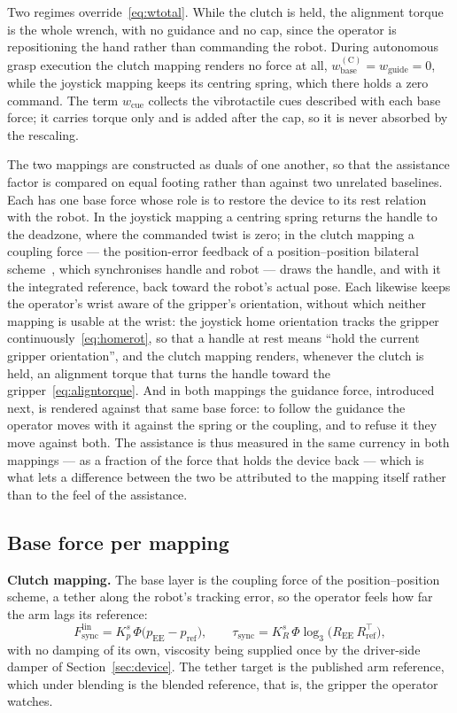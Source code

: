Two regimes override~\eqref{eq:wtotal}. While the clutch is held, the alignment torque is the whole wrench, with no guidance and no cap, since the operator is repositioning the hand rather than commanding the robot. During autonomous grasp execution the clutch mapping renders no force at all, $w_{\text{base}}^{(\text{C})} = w_{\text{guide}} = 0$, while the joystick mapping keeps its centring spring, which there holds a zero command. The term $w_{\text{cue}}$ collects the vibrotactile cues described with each base force; it carries torque only and is added after the cap, so it is never absorbed by the rescaling.

The two mappings are constructed as duals of one another, so that the assistance factor is compared on equal footing rather than against two unrelated baselines. Each has one base force whose role is to restore the device to its rest relation with the robot. In the joystick mapping a centring spring returns the handle to the deadzone, where the commanded twist is zero; in the clutch mapping a coupling force --- the position-error feedback of a position--position bilateral scheme~\cite{hokayem2006bilateral}, which synchronises handle and robot --- draws the handle, and with it the integrated reference, back toward the robot's actual pose. Each likewise keeps the operator's wrist aware of the gripper's orientation, without which neither mapping is usable at the wrist: the joystick home orientation tracks the gripper continuously~\eqref{eq:homerot}, so that a handle at rest means ``hold the current gripper orientation'', and the clutch mapping renders, whenever the clutch is held, an alignment torque that turns the handle toward the gripper~\eqref{eq:aligntorque}. And in both mappings the guidance force, introduced next, is rendered against that same base force: to follow the guidance the operator moves with it against the spring or the coupling, and to refuse it they move against both. The assistance is thus measured in the same currency in both mappings --- as a fraction of the force that holds the device back --- which is what lets a difference between the two be attributed to the mapping itself rather than to the feel of the assistance.

\subsection{Base force per mapping}
\label{sec:columnbase}

\textbf{Clutch mapping.} The base layer is the coupling force of the position--position scheme, a tether along the robot's tracking error, so the operator feels how far the arm lags its reference:
\begin{equation}
F_{\text{sync}}^{\text{lin}} = K_p^{s}\,\Phi\bigl(p_{\text{EE}} - p_{\text{ref}}\bigr),
\qquad
\tau_{\text{sync}} = K_R^{s}\,\Phi \log_3\!\bigl(R_{\text{EE}}\,R_{\text{ref}}^{\top}\bigr),
\label{eq:fsync}
\end{equation}
with no damping of its own, viscosity being supplied once by the driver-side damper of Section~\ref{sec:device}. The tether target is the published arm reference, which under blending is the blended reference, that is, the gripper the operator watches.


